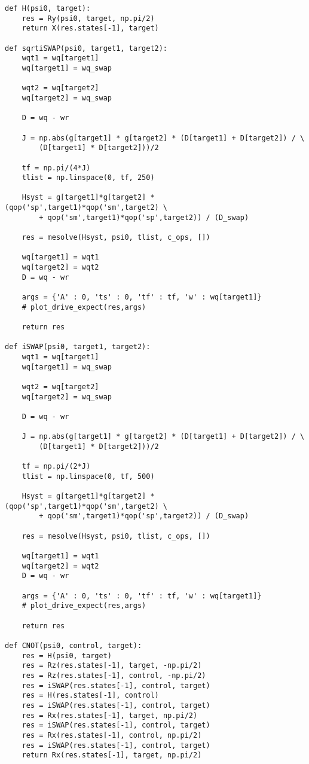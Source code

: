 \begin{verbatim}
def H(psi0, target):
    res = Ry(psi0, target, np.pi/2)
    return X(res.states[-1], target)

def sqrtiSWAP(psi0, target1, target2):
    wqt1 = wq[target1]
    wq[target1] = wq_swap
    
    wqt2 = wq[target2]
    wq[target2] = wq_swap

    D = wq - wr

    J = np.abs(g[target1] * g[target2] * (D[target1] + D[target2]) / \
        (D[target1] * D[target2]))/2

    tf = np.pi/(4*J)
    tlist = np.linspace(0, tf, 250)

    Hsyst = g[target1]*g[target2] * (qop('sp',target1)*qop('sm',target2) \
        + qop('sm',target1)*qop('sp',target2)) / (D_swap)

    res = mesolve(Hsyst, psi0, tlist, c_ops, [])

    wq[target1] = wqt1
    wq[target2] = wqt2
    D = wq - wr

    args = {'A' : 0, 'ts' : 0, 'tf' : tf, 'w' : wq[target1]}
    # plot_drive_expect(res,args)

    return res

def iSWAP(psi0, target1, target2):
    wqt1 = wq[target1]
    wq[target1] = wq_swap
    
    wqt2 = wq[target2]
    wq[target2] = wq_swap

    D = wq - wr

    J = np.abs(g[target1] * g[target2] * (D[target1] + D[target2]) / \
        (D[target1] * D[target2]))/2

    tf = np.pi/(2*J)
    tlist = np.linspace(0, tf, 500)

    Hsyst = g[target1]*g[target2] * (qop('sp',target1)*qop('sm',target2) \
        + qop('sm',target1)*qop('sp',target2)) / (D_swap)

    res = mesolve(Hsyst, psi0, tlist, c_ops, [])

    wq[target1] = wqt1
    wq[target2] = wqt2
    D = wq - wr

    args = {'A' : 0, 'ts' : 0, 'tf' : tf, 'w' : wq[target1]}
    # plot_drive_expect(res,args)

    return res

def CNOT(psi0, control, target):
    res = H(psi0, target)
    res = Rz(res.states[-1], target, -np.pi/2)
    res = Rz(res.states[-1], control, -np.pi/2)
    res = iSWAP(res.states[-1], control, target)
    res = H(res.states[-1], control)
    res = iSWAP(res.states[-1], control, target)
    res = Rx(res.states[-1], target, np.pi/2)
    res = iSWAP(res.states[-1], control, target)
    res = Rx(res.states[-1], control, np.pi/2)
    res = iSWAP(res.states[-1], control, target)
    return Rx(res.states[-1], target, np.pi/2)


\end{verbatim}

